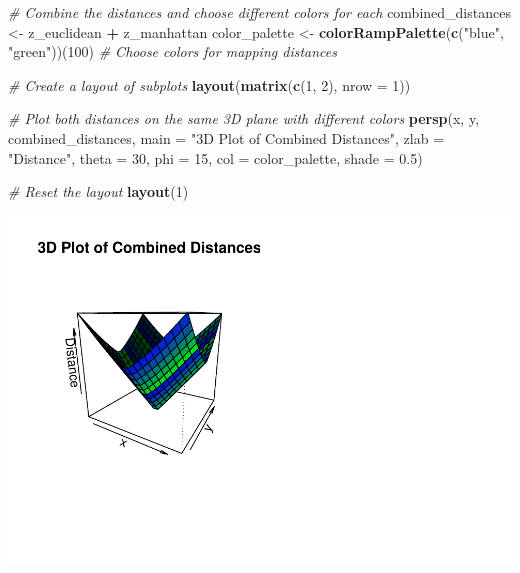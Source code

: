 \documentclass[
]{article}
\newenvironment{Shaded}{\begin{snugshade}}{\end{snugshade}}
\newcommand{\AttributeTok}[1]{\textcolor[rgb]{0.13,0.29,0.53}{#1}}
\newcommand{\CommentTok}[1]{\textcolor[rgb]{0.56,0.35,0.01}{\textit{#1}}}
\newcommand{\DecValTok}[1]{\textcolor[rgb]{0.00,0.00,0.81}{#1}}
\newcommand{\FloatTok}[1]{\textcolor[rgb]{0.00,0.00,0.81}{#1}}
\newcommand{\FunctionTok}[1]{\textcolor[rgb]{0.13,0.29,0.53}{\textbf{#1}}}
\newcommand{\NormalTok}[1]{#1}
\newcommand{\OtherTok}[1]{\textcolor[rgb]{0.56,0.35,0.01}{#1}}
\newcommand{\SpecialCharTok}[1]{\textcolor[rgb]{0.81,0.36,0.00}{\textbf{#1}}}
\newcommand{\StringTok}[1]{\textcolor[rgb]{0.31,0.60,0.02}{#1}}
\begin{document}
\begin{Shaded}
\begin{Highlighting}[]
\CommentTok{\# Combine the distances and choose different colors for each}
\NormalTok{combined\_distances }\OtherTok{\textless{}{-}}\NormalTok{ z\_euclidean }\SpecialCharTok{+}\NormalTok{ z\_manhattan}
\NormalTok{color\_palette }\OtherTok{\textless{}{-}} \FunctionTok{colorRampPalette}\NormalTok{(}\FunctionTok{c}\NormalTok{(}\StringTok{"blue"}\NormalTok{, }\StringTok{"green"}\NormalTok{))(}\DecValTok{100}\NormalTok{)  }\CommentTok{\# Choose colors for mapping distances}

\CommentTok{\# Create a layout of subplots}
\FunctionTok{layout}\NormalTok{(}\FunctionTok{matrix}\NormalTok{(}\FunctionTok{c}\NormalTok{(}\DecValTok{1}\NormalTok{, }\DecValTok{2}\NormalTok{), }\AttributeTok{nrow =} \DecValTok{1}\NormalTok{))}

\CommentTok{\# Plot both distances on the same 3D plane with different colors}
\FunctionTok{persp}\NormalTok{(x, y, combined\_distances,}
      \AttributeTok{main =} \StringTok{"3D Plot of Combined Distances"}\NormalTok{,}
      \AttributeTok{zlab =} \StringTok{"Distance"}\NormalTok{,}
      \AttributeTok{theta =} \DecValTok{30}\NormalTok{, }\AttributeTok{phi =} \DecValTok{15}\NormalTok{,}
      \AttributeTok{col =}\NormalTok{ color\_palette, }\AttributeTok{shade =} \FloatTok{0.5}\NormalTok{)}

\CommentTok{\# Reset the layout}
\FunctionTok{layout}\NormalTok{(}\DecValTok{1}\NormalTok{)}
\end{Highlighting}
\end{Shaded}

\includegraphics{week1_files/figure-latex/unnamed-chunk-4-1.pdf}
\end{document}
